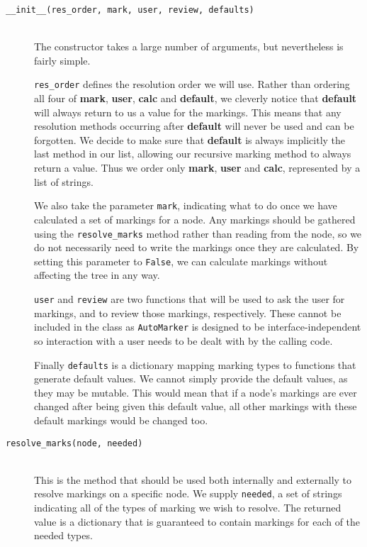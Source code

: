 \documentclass[twoside,a4paper]{report}
\begin{document}
\begin{description}
\item[\texttt{\_\_init\_\_(res\_order, mark, user, review, defaults)}] \hfill \\
The constructor takes a large number of arguments, but nevertheless is fairly simple.

\texttt{res\_order} defines the resolution order we will use. Rather than ordering all four of \textbf{mark}, \textbf{user}, \textbf{calc} and
\textbf{default}, we cleverly notice that \textbf{default} will always return to us a value for the markings. This means that any resolution methods
occurring after \textbf{default} will never be used and can be forgotten. We decide to make sure that \textbf{default} is always implicitly the last method
in our list, allowing our recursive marking method to always return a value. Thus we order only \textbf{mark}, \textbf{user} and \textbf{calc},
represented by a list of strings.

We also take the parameter \texttt{mark}, indicating what to do once we have calculated a set of markings for a node. Any markings should be gathered using
the \texttt{resolve\_marks} method rather than reading from the node, so we do not necessarily need to write the markings once they are calculated. By
setting this parameter to \texttt{False}, we can calculate markings without affecting the tree in any way.

\texttt{user} and \texttt{review} are two functions that will be used to ask the user for markings, and to review those markings, respectively. These
cannot be included in the class as \texttt{AutoMarker} is designed to be interface-independent so interaction with a user needs to be dealt with by
the calling code.

Finally \texttt{defaults} is a dictionary mapping marking types to functions that generate default values. We cannot simply provide the default values,
as they may be mutable. This would mean that if a node's markings are ever changed after being given this default value, all other markings with these default
markings would be changed too.

\item[\texttt{resolve\_marks(node, needed)}] \hfill \\
This is the method that should be used both internally and externally to resolve markings on a specific node. We supply \texttt{needed}, a set of strings
indicating all of the types of marking we wish to resolve. The returned value is a dictionary that is guaranteed to contain markings for each of the
needed types.


\end{description}
\end{document}
